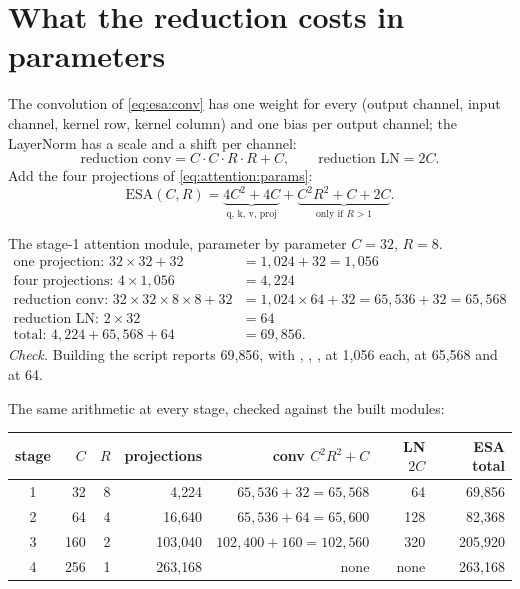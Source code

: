 \section{What the reduction costs in parameters}\label{sec:esa:params}

The convolution of \cref{eq:esa:conv} has one weight for every (output channel, input channel,
kernel row, kernel column) and one bias per output channel; the LayerNorm has a scale and a shift
per channel:
\begin{equation}\label{eq:esa:convparams}
  \text{reduction conv} = C\cdot C\cdot R\cdot R + C,\qquad \text{reduction LN} = 2C .
\end{equation}
Add the four projections of \cref{eq:attention:params}:
\begin{equation}\label{eq:esa:params}
  \text{ESA}(C, R) = \underbrace{4C^2 + 4C}_{\text{q, k, v, proj}} + \underbrace{C^2R^2 + C + 2C}_{\text{only if } R > 1} .
\end{equation}

\begin{worked}[label={we:esa:params1}]{The stage-1 attention module, parameter by parameter}
$C = 32$, $R = 8$.
\begin{align*}
  \text{one projection: } 32\times32 + 32 &= 1{,}024 + 32 = 1{,}056\\
  \text{four projections: } 4\times1{,}056 &= 4{,}224\\
  \text{reduction conv: } 32\times32\times8\times8 + 32 &= 1{,}024\times64 + 32 = 65{,}536 + 32 = 65{,}568\\
  \text{reduction LN: } 2\times32 &= 64\\
  \text{total: } 4{,}224 + 65{,}568 + 64 &= 69{,}856 .
\end{align*}
\emph{Check.} Building  the script reports 69{,}856, with
, , ,  at 1{,}056 each,  at 65{,}568 and
 at 64\tagC.
\end{worked}

The same arithmetic at every stage, checked against the built modules\tagC:
\begin{center}
\begin{tabular}{crrrrrr}
\toprule
stage & $C$ & $R$ & projections & conv $C^2R^2 + C$ & LN $2C$ & ESA total\\
\midrule
1 & 32 & 8 & 4{,}224 & $65{,}536 + 32 = 65{,}568$ & 64 & 69{,}856\\
2 & 64 & 4 & 16{,}640 & $65{,}536 + 64 = 65{,}600$ & 128 & 82{,}368\\
3 & 160 & 2 & 103{,}040 & $102{,}400 + 160 = 102{,}560$ & 320 & 205{,}920\\
4 & 256 & 1 & 263{,}168 & none & none & 263{,}168\\
\bottomrule
\end{tabular}
\end{center}

